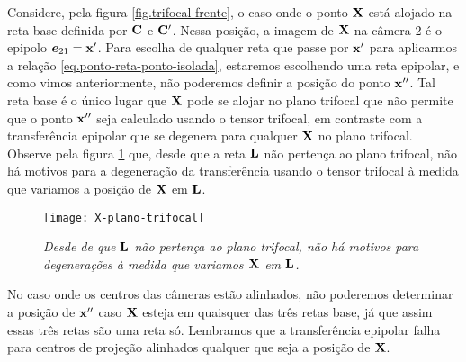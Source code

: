 Considere, pela figura \ref{fig.trifocal-frente}, o caso onde o ponto $\mathbf{X}$ está alojado na reta base definida por ${\bf C}$ e ${\bf C}'$. Nessa posição, a imagem de $\mathbf{X}$ na câmera 2 é o epipolo $\boldsymbol{e}_{21}=\mathbf{x}'$. Para escolha de qualquer reta que passe por $\mathbf{x}'$ para aplicarmos a relação \ref{eq.ponto-reta-ponto-isolada}, estaremos escolhendo uma reta epipolar, e como vimos anteriormente, não poderemos definir a posição do ponto $\mathbf{x}''$. Tal reta base é o único lugar que $\mathbf{X}$ pode se alojar no plano trifocal que não permite que o ponto $\mathbf{x}''$ seja calculado usando o tensor trifocal, em contraste com a transferência epipolar que se degenera para qualquer $\mathbf{X}$ no plano trifocal. Observe pela figura \ref{fig.X-plano-trifocal} que, desde que a reta ${\bf L}$ não pertença ao plano trifocal, não há motivos para a degeneração da transferência usando o tensor trifocal à medida que variamos a posição de $\mathbf{X}$ em ${\bf L}$. 
\begin{figure}[!htb]
\centering
\texttt{[image: X-plano-trifocal]}
\caption{{\it Desde de que ${\bf L}$ não pertença ao plano trifocal, não há motivos para degenerações à medida que variamos $\mathbf{X}$ em ${\bf L}$.}}
\label{fig.X-plano-trifocal}
\end{figure}
No caso onde os centros das câmeras estão alinhados, não poderemos determinar a posição de $\mathbf{x}''$ caso $\mathbf{X}$ esteja em quaisquer das três retas base, já que assim essas três retas são uma reta só. Lembramos que a transferência epipolar falha para centros de projeção alinhados qualquer que seja a posição de $\mathbf{X}$.  

